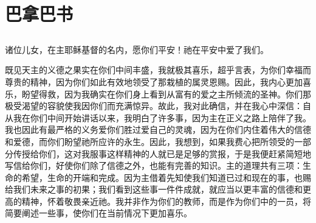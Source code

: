 
\chapter{巴拿巴书}



\section{}

诸位儿女，在主耶稣基督的名内，愿你们平安！祂在平安中爱了我们。\par

既见天主的义德之果实在你们中间丰盛，我就极其喜乐，超乎言表，为你们幸福而尊贵的精神，因为你们如此有效地领受了那栽植的属灵恩赐。因此，我内心更加喜乐，盼望得救，因为我确实在你们身上看到从富有的爱之主所倾流的圣神。你们那极受渴望的容貌使我因你们而充满惊异。故此，我对此确信，并在我心中深信：自从我在你们中间开始讲话以来，我明白了许多事，因为主在正义之路上陪伴了我。我也因此有最严格的义务爱你们胜过爱自己的灵魂，因为在你们内住着伟大的信德和爱德，而你们盼望祂所应许的永生。因此，我想到，如果我费心把所领受的一部分传授给你们，这对我服事这样精神的人就已是足够的赏报，于是我便赶紧简短地写信给你们，好使你们除了信德之外，也能有完善的知识。主的道理共有三项：生命的希望，生命的开端和完成。因为主借着先知使我们知道已过和现在的事，也赐给我们未来之事的初果；我们看到这些事一件件成就，就应当以更丰富的信德和更高的精神，怀着敬畏亲近祂。我并非作为你们的教师，而是作为你们中的一员，将简要阐述一些事，使你们在当前情况下更加喜乐。\par


\section{}


